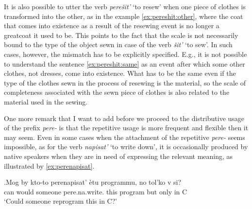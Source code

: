 It is also possible to utter the verb \textit{pere\v{s}it'} `to resew' when one piece of clothes is transformed into the other, as in the example \ref{ex:pereshit:other}, where the coat that comes into existence as a result of the resewing event is no longer a greatcoat it used to be. This points to the fact that the scale is not necessarily bound to the type of the object sewn in case of the verb \textit{\v{s}it'} `to sew'. In such cases, however, the mismatch has to be explicitly specified. E.g., it is not possible to understand the sentence \ref{ex:pereshit:same} as an event after which some other clothes, not dresses, come into existence. What has to be the same even if the type of the clothes sewn in the process of resewing is the material, so the scale of completeness associated with the sewn piece of clothes is also related to the material used in the sewing.


One more remark that I want to add before we proceed to the distributive usage of the prefix \textit{pere-} is that the repetitive usage is more frequent and flexible then it may seem. Even in some cases when the attachment of the repetitive \textit{pere-} seems impossible, as for the verb \textit{napisat'} `to write down', it is occasionally produced by native speakers when they are in need of expressing the relevant meaning, as illustrated by \ref{ex:perenapisat}. 

\exg.\label{ex:perenapisat}Mog by kto-to perenapisat' \`{e}tu programmu, no tol'ko v si?\\
can would someone pere.na.write. this program but only in C\\
\trans `Could someone reprogram this in C?'

